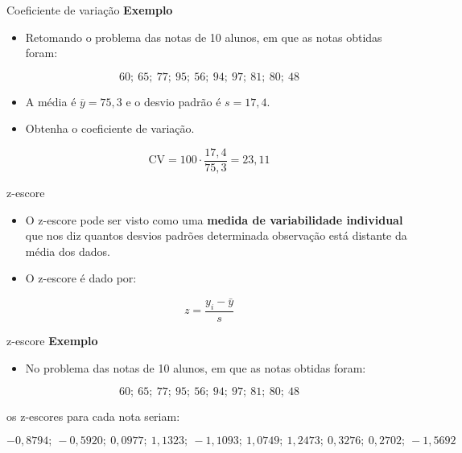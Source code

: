 \documentclass[
  ignorenonframetext,
  serif,
  professionalfont,
  usenames,
  dvipsnames,
  aspectratio = 169]{beamer}
\providecommand{\tightlist}{%
  \setlength{\itemsep}{0pt}\setlength{\parskip}{0pt}}
\renewcommand{\tightlist}{%
  \setlength{\itemsep}{0\baselineskip}
  \setlength{\parskip}{0.25\baselineskip}
}
\begin{document}
\begin{frame}{Coeficiente de variação}
\label{coeficiente-de-variauxe7uxe3o-1}
\textbf{Exemplo}

\begin{itemize}
\tightlist
\item
  Retomando o problema das notas de 10 alunos, em que as notas obtidas
  foram:
\end{itemize}

\[60;\ 65;\ 77;\ 95;\ 56;\ 94;\ 97;\ 81;\ 80;\ 48\]

\begin{itemize}
\item
  A média é \(\overline{y} = 75,3\) e o desvio padrão é \(s = 17,4\).
\item
  Obtenha o coeficiente de variação.
\end{itemize}

\[
\textrm{CV} = 100 \cdot \frac{17,4}{75,3} = 23,11
\]
\end{frame}

\begin{frame}{z-escore}
\label{z-escore}
\begin{itemize}
\item
  O z-escore pode ser visto como uma
  \textbf{medida de variabilidade individual} que nos diz quantos
  desvios padrões determinada observação está distante da média dos
  dados.
\item
  O z-escore é dado por:
\end{itemize}

\[z = \frac{y_i-\bar{y}}{s}\]
\end{frame}

\begin{frame}{z-escore}
\label{z-escore-1}
\textbf{Exemplo}

\begin{itemize}
\tightlist
\item
  No problema das notas de 10 alunos, em que as notas obtidas foram:
\end{itemize}

\[60;\ 65;\ 77;\ 95;\ 56;\ 94;\ 97;\ 81;\ 80;\ 48\]

os z-escores para cada nota seriam:

\[-0,8794;\ -0,5920;\  0,0977;\  1,1323;\ -1,1093;\  1,0749;\  1,2473;\  0,3276;\  0,2702;\ -1,5692\]
\end{frame}
\end{document}
